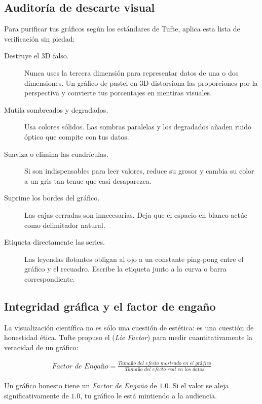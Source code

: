 \subsection*{Auditoría de descarte visual}

Para purificar tus gráficos según los estándares de Tufte, aplica esta lista de verificación sin piedad:

\begin{description}
	\item[Destruye el 3D falso.] Nunca uses la tercera dimensión para representar datos de una o dos dimensiones.
	      Un gráfico de pastel en 3D distorsiona las proporciones por la perspectiva y convierte tus porcentajes en mentiras visuales.
	\item[Mutila sombreados y degradados.] Usa colores sólidos.
	      Las sombras paralelas y los degradados añaden ruido óptico que compite con tus datos.
	\item[Suaviza o elimina las cuadrículas.] Si son indispensables para leer valores, reduce su grosor y cambia su color a un gris tan tenue que casi desaparezca.
	\item[Suprime los bordes del gráfico.] Las cajas cerradas son innecesarias.
	      Deja que el espacio en blanco actúe como delimitador natural.
	\item[Etiqueta directamente las series.] Las leyendas flotantes obligan al ojo a un constante ping-pong entre el gráfico y el recuadro.
	      Escribe la etiqueta junto a la curva o barra correspondiente.
\end{description}

\subsection*{Integridad gráfica y el factor de engaño}

La visualización científica no es sólo una cuestión de estética: es una cuestión de honestidad ética.
Tufte propuso el  (\emph{Lie Factor}) para medir cuantitativamente la veracidad de un gráfico:

\begin{align*}
	\textit{Factor de Engaño} = \frac{\textit{Tamaño del efecto mostrado en el gráfico}}{\textit{Tamaño del efecto real en los datos}}
\end{align*}

Un gráfico honesto tiene un \emph{Factor de Engaño} de \(1.0\).
Si el valor se aleja significativamente de \(1.0\), tu gráfico le está mintiendo a la audiencia.

